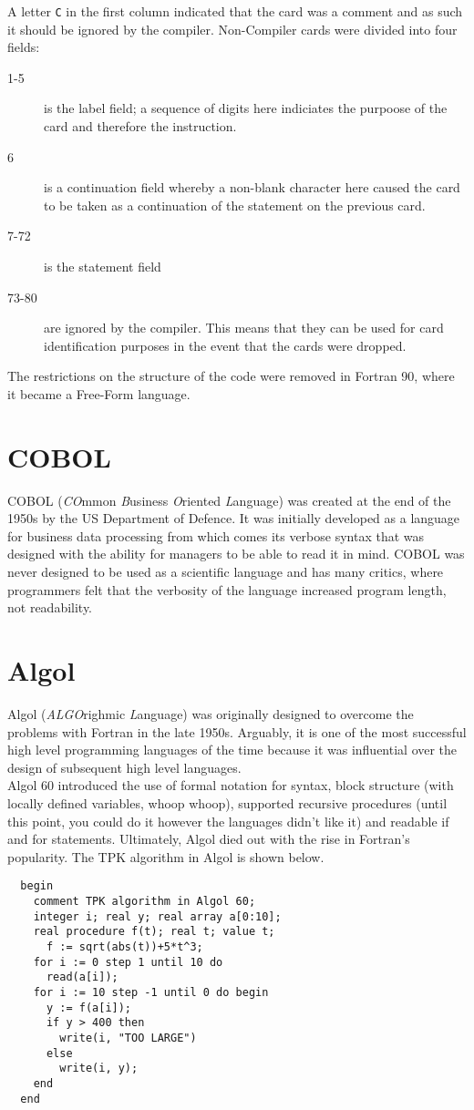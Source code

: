 A letter \verb|C| in the first column indicated that the card was a comment and as such it should be ignored by the compiler. Non-Compiler cards were divided into four fields:
\begin{description}
    \item[1-5] is the label field; a sequence of digits here indiciates the purpoose of the card and therefore the instruction.
    \item[6] is a continuation field whereby a non-blank character here caused the card to be taken as a continuation of the statement on the previous card. 
    \item[7-72] is the statement field
    \item[73-80] are ignored by the compiler. This means that they can be used for card identification purposes in the event that the cards were dropped.
\end{description}

The restrictions on the structure of the code were removed in Fortran 90, where it became a Free-Form language. 

\section{COBOL}
COBOL (\textit{CO}mmon \textit{B}usiness \textit{O}riented \textit{L}anguage) was created at the end of the 1950s by the US Department of Defence. It was initially developed as a language for business data processing from which comes its verbose syntax that was designed with the ability for managers to be able to read it in mind. COBOL was never designed to be used as a scientific language and has many critics, where programmers felt that the verbosity of the language increased program length, not readability. 

\section{Algol}
Algol (\textit{ALGO}righmic \textit{L}anguage) was originally designed to overcome the problems with Fortran in the late 1950s. Arguably, it is one of the most successful high level programming languages of the time  because it was influential over the design of subsequent high level languages.\\

Algol 60 introduced the use of formal notation for syntax, block structure (with locally defined variables, whoop whoop), supported recursive procedures (until this point, you could do it however the languages didn't like it) and readable if and for statements. Ultimately, Algol died out with the rise in Fortran's popularity. The TPK algorithm in Algol is shown below.
\begin{verbatim}
  begin
    comment TPK algorithm in Algol 60;
    integer i; real y; real array a[0:10];
    real procedure f(t); real t; value t;
      f := sqrt(abs(t))+5*t^3;
    for i := 0 step 1 until 10 do
      read(a[i]);
    for i := 10 step -1 until 0 do begin
      y := f(a[i]);
      if y > 400 then
        write(i, "TOO LARGE")
      else
        write(i, y);
    end
  end
\end{verbatim}

